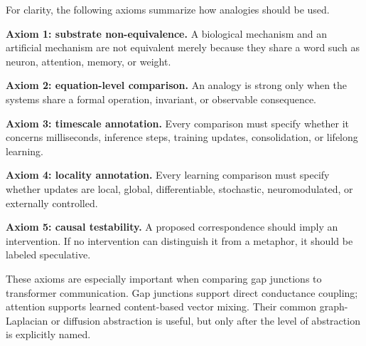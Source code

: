 \documentclass[11pt]{article}
\newcommand{\1}{\mathbf{1}}
\begin{document}
For clarity, the following axioms summarize how analogies should be used.

\textbf{Axiom 1: substrate non-equivalence.} A biological mechanism and an artificial mechanism are not equivalent merely because they share a word such as neuron, attention, memory, or weight.

\textbf{Axiom 2: equation-level comparison.} An analogy is strong only when the systems share a formal operation, invariant, or observable consequence.

\textbf{Axiom 3: timescale annotation.} Every comparison must specify whether it concerns milliseconds, inference steps, training updates, consolidation, or lifelong learning.

\textbf{Axiom 4: locality annotation.} Every learning comparison must specify whether updates are local, global, differentiable, stochastic, neuromodulated, or externally controlled.

\textbf{Axiom 5: causal testability.} A proposed correspondence should imply an intervention. If no intervention can distinguish it from a metaphor, it should be labeled speculative.

These axioms are especially important when comparing gap junctions to transformer communication. Gap junctions support direct conductance coupling; attention supports learned content-based vector mixing. Their common graph-Laplacian or diffusion abstraction is useful, but only after the level of abstraction is explicitly named.
\end{document}
